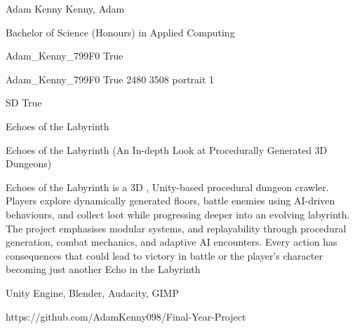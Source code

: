 
\begingroup{}\relax



\def\Key{Adam_Kenny_799F0}

{Adam Kenny}
{Kenny, Adam}

{Bachelor of Science (Honours) in Applied Computing}

{Adam_Kenny_799F0}
{True}

{Adam_Kenny_799F0}
{True}
{2480}
{3508}
{portrait}
{1}

{SD}
{True}

{Echoes of the Labyrinth}

{Echoes of the Labyrinth (An In-depth Look at Procedurally Generated 3D Dungeons)}

{Echoes of the Labyrinth is a 3D , Unity-based procedural dungeon crawler. 
Players explore dynamically generated floors, battle enemies using AI-driven behaviours, and collect loot while progressing deeper into an evolving labyrinth. 
The project emphasises modular systems, and replayability through procedural generation, combat mechanics, and adaptive AI encounters.
Every action has consequences that could lead to victory in battle or the player's character becoming just another Echo in the Labyrinth}

{Unity Engine, Blender, Audacity, GIMP}

{https://github.com/AdamKenny098/Final-Year-Project}

